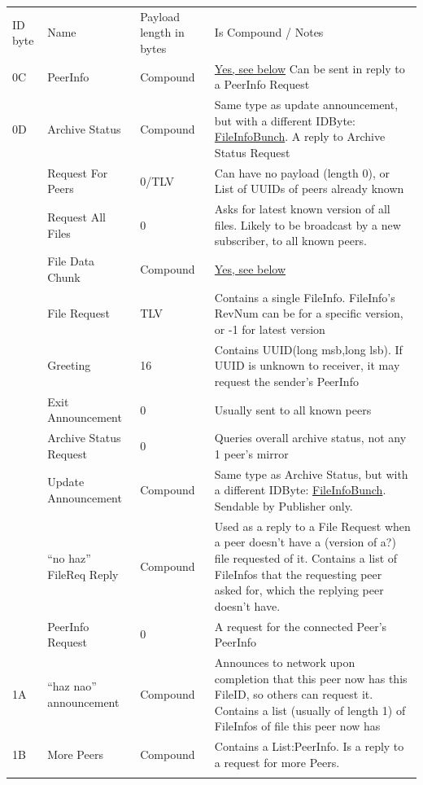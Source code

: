 \documentclass[12pt,a4paper,]{book}
\begin{document}
\begin{longtable}[c]{@{}llll@{}}
\toprule\addlinespace
ID byte & Name & Payload length in bytes & Is Compound / Notes
\\\addlinespace
\midrule\endhead
0C & PeerInfo & Compound & \hyperref[PeerInfo]{Yes, see below} Can be
sent in reply to a PeerInfo Request
\\\addlinespace
0D & Archive Status & Compound & Same type as update announcement, but
with a different IDByte: \hyperref[FileInfoBunch]{FileInfoBunch}. A
reply to Archive Status Request
\\\addlinespace
10 & Request For Peers & 0/TLV & Can have no payload (length 0), or List
of UUIDs of peers already known
\\\addlinespace
11 & Request All Files & 0 & Asks for latest known version of all files.
Likely to be broadcast by a new subscriber, to all known peers.
\\\addlinespace
12 & File Data Chunk & Compound & \hyperref[FileDataChunk]{Yes, see
below}
\\\addlinespace
13 & File Request & TLV & Contains a single FileInfo. FileInfo's RevNum
can be for a specific version, or -1 for latest version
\\\addlinespace
14 & Greeting & 16 & Contains UUID(long msb,long lsb). If UUID is
unknown to receiver, it may request the sender's PeerInfo
\\\addlinespace
15 & Exit Announcement & 0 & Usually sent to all known peers
\\\addlinespace
16 & Archive Status Request & 0 & Queries overall archive status, not
any 1 peer's mirror
\\\addlinespace
17 & Update Announcement & Compound & Same type as Archive Status, but
with a different IDByte: \hyperref[FileInfoBunch]{FileInfoBunch}.
Sendable by Publisher only.
\\\addlinespace
18 & ``no haz'' FileReq Reply & Compound & Used as a reply to a File
Request when a peer doesn't have a (version of a?) file requested of it.
Contains a list of FileInfos that the requesting peer asked for, which
the replying peer doesn't have.
\\\addlinespace
19 & PeerInfo Request & 0 & A request for the connected Peer's PeerInfo
\\\addlinespace
1A & ``haz nao'' announcement & Compound & Announces to network upon
completion that this peer now has this FileID, so others can request it.
Contains a list (usually of length 1) of FileInfos of file this peer now
has
\\\addlinespace
1B & More Peers & Compound & Contains a List:PeerInfo. Is a reply to a
request for more Peers.
\\\addlinespace
\bottomrule
\end{longtable}
\end{document}
